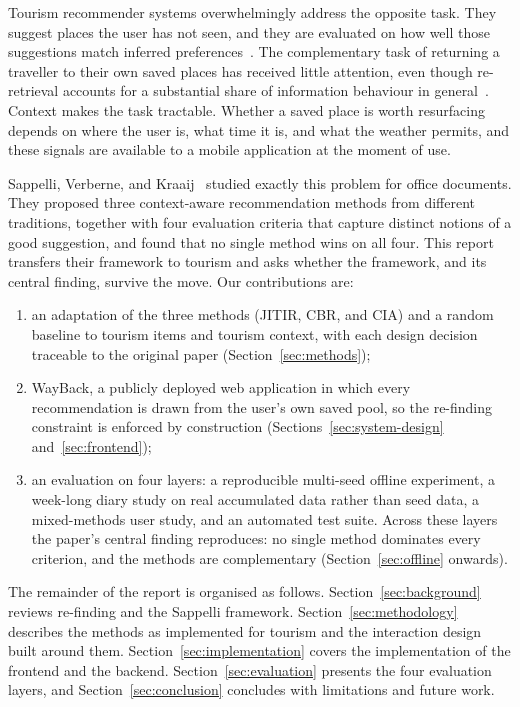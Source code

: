\documentclass[acmlarge]{acmart}
\begin{document}
Tourism recommender systems overwhelmingly address the opposite task.
They suggest places the user has not seen, and they are evaluated on how
well those suggestions match inferred preferences~\cite{borras2014tourism}.
The complementary task of returning a traveller to their own saved places
has received little attention, even though re-retrieval accounts for a
substantial share of information behaviour in
general~\cite{teevan2007reretrieval}. Context makes the task tractable.
Whether a saved place is worth resurfacing depends on where the user is,
what time it is, and what the weather permits, and these signals are
available to a mobile application at the moment of use.

Sappelli, Verberne, and Kraaij~\cite{sappelli2017} studied exactly this
problem for office documents. They proposed three context-aware
recommendation methods from different traditions, together with four
evaluation criteria that capture distinct notions of a good suggestion,
and found that no single method wins on all four. This report transfers
their framework to tourism and asks whether the framework, and its central
finding, survive the move. Our contributions are:

\begin{enumerate}
  \item an adaptation of the three methods (JITIR, CBR, and CIA) and a
        random baseline to tourism items and tourism context, with each
        design decision traceable to the original paper
        (Section~\ref{sec:methods});
  \item WayBack, a publicly deployed web application in which every
        recommendation is drawn from the user's own saved pool, so the
        re-finding constraint is enforced by construction
        (Sections~\ref{sec:system-design} and~\ref{sec:frontend});
  \item an evaluation on four layers: a reproducible multi-seed offline
        experiment, a week-long diary study on real accumulated data
        rather than seed data, a mixed-methods user study, and an
        automated test suite. Across these layers the paper's central
        finding reproduces: no single method dominates every criterion,
        and the methods are complementary
        (Section~\ref{sec:offline} onwards).
\end{enumerate}

The remainder of the report is organised as follows. Section~\ref{sec:background}
reviews re-finding and the Sappelli framework. Section~\ref{sec:methodology}
describes the methods as implemented for tourism and the interaction design
built around them. Section~\ref{sec:implementation} covers the
implementation of the frontend and the backend.
Section~\ref{sec:evaluation} presents the four evaluation layers, and
Section~\ref{sec:conclusion} concludes with limitations and future work.
\end{document}
